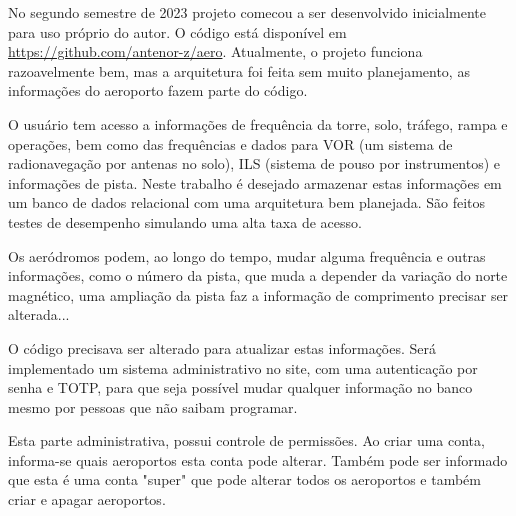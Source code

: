 No segundo semestre de 2023 projeto comecou a ser desenvolvido inicialmente para uso próprio do autor.
O código está disponível em \url{https://github.com/antenor-z/aero}. Atualmente, o
projeto funciona razoavelmente bem, mas a arquitetura foi feita sem muito planejamento, as
informações do aeroporto fazem parte do código.

O usuário tem acesso a informações de frequência da torre, solo, tráfego, rampa
e operações, bem como das frequências e dados para VOR (um sistema de radionavegação
por antenas no solo), ILS (sistema de pouso por instrumentos) e informações de 
pista. Neste trabalho é desejado armazenar estas informações em um banco de dados relacional com 
uma arquitetura bem planejada. São feitos testes de desempenho simulando uma alta taxa 
de acesso.

Os aeródromos podem, ao longo do tempo, mudar alguma frequência e outras
informações, como o número da pista, que muda a depender da variação do norte 
magnético, uma ampliação da pista faz a informação de comprimento precisar ser 
alterada...

O código precisava ser alterado para atualizar estas informações. Será implementado
 um sistema administrativo no site, com uma autenticação por senha e TOTP, para 
 que seja possível mudar qualquer informação no banco mesmo por pessoas que não 
 saibam programar.

Esta parte administrativa, possui controle de permissões. Ao criar uma conta, 
informa-se quais aeroportos esta conta pode alterar. Também pode ser informado que
  esta é uma conta "super" que pode alterar todos os aeroportos e também criar e 
  apagar aeroportos.
